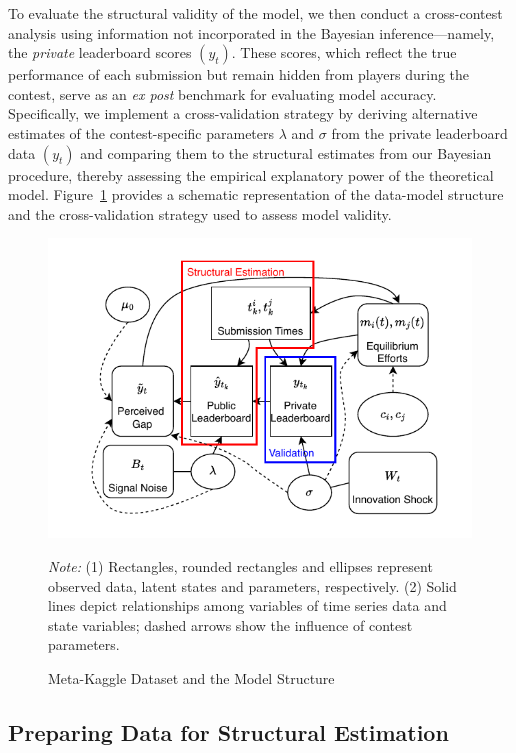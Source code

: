 \documentclass[mnsc]{informs3}
\begin{document}
To evaluate the structural validity of the model, we then conduct a cross-contest analysis using information not incorporated in the Bayesian inference—namely, the \textit{private} leaderboard scores $(y_t)$. 
These scores, which reflect the true performance of each submission but remain hidden from players during the contest, serve as an \textit{ex post} benchmark for evaluating model accuracy.
Specifically, we implement a cross-validation strategy by deriving alternative estimates of the contest-specific parameters $\lambda$ and $\sigma$ from the private leaderboard data $(y_t)$ and comparing them to the structural estimates from our Bayesian procedure, thereby assessing the empirical explanatory power of the theoretical model.
Figure~\ref{kaggledata-diagram} provides a schematic representation of the data-model structure and the cross-validation strategy used to assess model validity.

\begin{figure}[!ht]
	\centering
	\noindent\includegraphics[scale=1.5]{kaggledata_diagram.pdf}
	\caption{Meta-Kaggle Dataset and the Model Structure}
	\label{kaggledata-diagram}
	\begin{minipage}{\textwidth}
{\footnotesize
\medskip
\textit{Note:} (1) Rectangles, rounded rectangles and ellipses represent observed data, latent states and parameters, respectively. 
(2) Solid lines depict relationships among variables of time series data and state variables; dashed arrows show the influence of contest parameters. 
}
\end{minipage}
\end{figure}


\subsection{Preparing Data for Structural Estimation}
\end{document}
